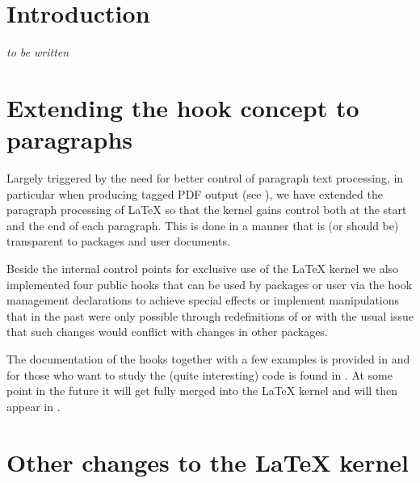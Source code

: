 \documentclass{ltnews}
\providecommand\tubcommand[1]{}
\begin{document}
\tubcommand{\addtolength\textheight{4.2pc}}   %

\maketitle
{ \spaceskip=3.33pt  \tableofcontents}

\setlength{}


\medskip


\section{Introduction}

\emph{to be written}




\section{Extending the hook concept to paragraphs}

Largely triggered by the need for better control of paragraph text
processing, in particular when producing tagged PDF output (see
\cite{33:blueprint}), we have extended the paragraph processing of
\LaTeX{} so that the kernel gains control both at the start and the
end of each paragraph. This is done in a manner that is (or should
be) transparent to packages and user documents.

Beside the internal control points for exclusive use of the \LaTeX{}
kernel we also implemented four public hooks that can be used by
packages or user via the hook management declarations to achieve
special effects or implement manipulations that in the past were only
possible through redefinitions of  or  with the
usual issue that such changes would conflict with changes in other
packages.

The documentation of the hooks together with a few examples is
provided in  and for those who want to study the
(quite interesting) code is found in . At
some point in the future it will get fully merged into the \LaTeX{}
kernel and will then appear in .



\section{Other changes to the \LaTeX{} kernel}
\end{document}
